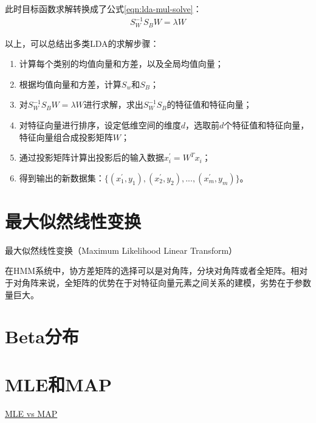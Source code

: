此时目标函数求解转换成了公式\ref{eqn:lda-mul-solve}：
\begin{align}
\label{eqn:lda-mul-solve}
S_{W}^{-1}S_{B}W = \lambda{W}
\end{align}

以上，可以总结出多类LDA的求解步骤：
\begin{enumerate}
  \item 计算每个类别的均值向量和方差，以及全局均值向量；
  \item 根据均值向量和方差，计算$S_w$和$S_B$；
  \item 对$S_{W}^{-1}S_{B}W = \lambda{W}$进行求解，求出$S_{W}^{-1}S_{B}$的特征值和特征向量；
  \item 对特征向量进行排序，设定低维空间的维度$d$，选取前$d$个特征值和特征向量，特征向量组合成投影矩阵$W$；
  \item 通过投影矩阵计算出投影后的输入数据$x_{i}^{'}=W^{T}x_{i}$；
  \item 得到输出的新数据集：$\{(x_{1}^{'}, y_1), (x_{2}^{'}, y_2), ..., (x_{m}^{'}, y_m)\}$。
\end{enumerate}

\section{最大似然线性变换}
最大似然线性变换（Maximum Likelihood Linear Transform）

在HMM系统中，协方差矩阵的选择可以是对角阵，分块对角阵或者全矩阵。相对于对角阵来说，全矩阵的优势在于对特征向量元素之间关系的建模，劣势在于参数量巨大。

\section{Beta分布}
  
\section{MLE和MAP}

\href{https://wiseodd.github.io/techblog/2017/01/01/mle-vs-map/}{MLE vs MAP}

